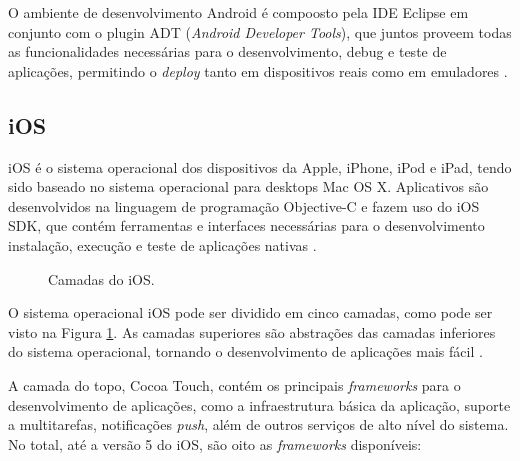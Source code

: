 \documentclass[diss]{template/setrem}
\begin{document}
O ambiente de desenvolvimento Android é compoosto pela IDE Eclipse em conjunto com o plugin ADT (\emph{Android Developer Tools}), que juntos proveem todas as funcionalidades necessárias para o desenvolvimento, debug e teste de aplicações, permitindo o \emph{deploy} tanto em dispositivos reais como em emuladores \citep{Android2012}.

\subsection{iOS}
iOS é o sistema operacional dos dispositivos da Apple, iPhone, iPod e iPad, tendo sido baseado no sistema operacional para desktops Mac OS X. Aplicativos são desenvolvidos na linguagem de programação Objective-C e fazem uso do iOS SDK, que contém ferramentas e interfaces necessárias para o desenvolvimento instalação, execução e teste de aplicações nativas \citep{Apple2011}.

\begin{figure}[!h]
    \caption{Camadas do iOS.}
    \label{fig:ios-layers}
\end{figure}

O sistema operacional iOS pode ser dividido em cinco camadas, como pode ser visto na Figura \ref{fig:ios-layers}. As camadas superiores são abstrações das camadas inferiores do sistema operacional, tornando o desenvolvimento de aplicações mais fácil \citep{Apple2011}.

A camada do topo, Cocoa Touch, contém os principais \emph{frameworks} para o desenvolvimento de aplicações, como a infraestrutura básica da aplicação, suporte a multitarefas, notificações \emph{push}, além de outros serviços de alto nível do sistema. No total, até a versão 5 do iOS, são oito as \emph{frameworks} disponíveis:
\end{document}
